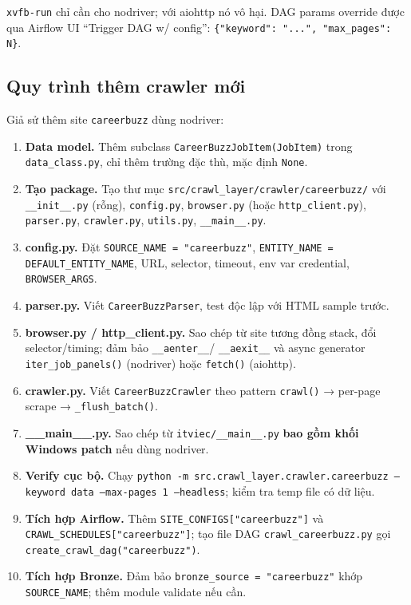 \texttt{xvfb-run} chỉ cần cho nodriver; với aiohttp nó vô hại. DAG params override
được qua Airflow UI ``Trigger DAG w/ config'': \texttt{\{"keyword": "...",
"max\_pages": N\}}.


\subsection{Quy trình thêm crawler mới}
\label{subsec:crawl-addnew}

Giả sử thêm site \texttt{careerbuzz} dùng nodriver:

\begin{enumerate}
    \item \textbf{Data model.} Thêm subclass \texttt{CareerBuzzJobItem(JobItem)}
          trong \texttt{data\_class.py}, chỉ thêm trường đặc thù, mặc định
          \texttt{None}.
    \item \textbf{Tạo package.} Tạo thư mục
          \texttt{src/crawl\_layer/crawler/careerbuzz/} với \texttt{\_\_init\_\_.py}
          (rỗng), \texttt{config.py}, \texttt{browser.py} (hoặc
          \texttt{http\_client.py}), \texttt{parser.py}, \texttt{crawler.py},
          \texttt{utils.py}, \texttt{\_\_main\_\_.py}.
    \item \textbf{config.py.} Đặt \texttt{SOURCE\_NAME = "careerbuzz"},
          \texttt{ENTITY\_NAME = DEFAULT\_ENTITY\_NAME}, URL, selector, timeout,
          env var credential, \texttt{BROWSER\_ARGS}.
    \item \textbf{parser.py.} Viết \texttt{CareerBuzzParser}, test độc lập với
          HTML sample trước.
    \item \textbf{browser.py / http\_client.py.} Sao chép từ site tương đồng
          stack, đổi selector/timing; đảm bảo \texttt{\_\_aenter\_\_}/
          \texttt{\_\_aexit\_\_} và async generator \texttt{iter\_job\_panels()}
          (nodriver) hoặc \texttt{fetch()} (aiohttp).
    \item \textbf{crawler.py.} Viết \texttt{CareerBuzzCrawler} theo pattern
          \texttt{crawl()} → per-page scrape → \texttt{\_flush\_batch()}.
    \item \textbf{\_\_main\_\_.py.} Sao chép từ \texttt{itviec/\_\_main\_\_.py}
          \textbf{bao gồm khối Windows patch} nếu dùng nodriver.
    \item \textbf{Verify cục bộ.} Chạy \texttt{python -m
          src.crawl\_layer.crawler.careerbuzz --keyword data --max-pages 1
          --headless}; kiểm tra temp file có dữ liệu.
    \item \textbf{Tích hợp Airflow.} Thêm \texttt{SITE\_CONFIGS["careerbuzz"]} và
          \texttt{CRAWL\_SCHEDULES["careerbuzz"]}; tạo file DAG
          \texttt{crawl\_careerbuzz.py} gọi \texttt{create\_crawl\_dag("careerbuzz")}.
    \item \textbf{Tích hợp Bronze.} Đảm bảo \texttt{bronze\_source = "careerbuzz"}
          khớp \texttt{SOURCE\_NAME}; thêm module validate nếu cần.
\end{enumerate}


